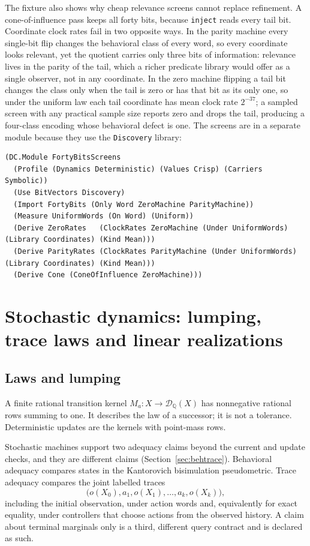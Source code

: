 \documentclass[11pt]{article}
\newcommand{\code}[1]{\texttt{#1}}
\newcommand{\Q}{\mathbb{Q}}
\theoremstyle{definition}
\theoremstyle{plain}
\begin{document}
The fixture also shows why cheap relevance screens cannot replace refinement. A cone-of-influence
pass keeps all forty bits, because \code{inject} reads every tail bit. Coordinate clock rates
\cite{paperone} fail in two opposite ways. In the parity machine every single-bit flip changes
the behavioral class of every word, so every coordinate looks relevant, yet the quotient carries
only three bits of information: relevance lives in the parity of the tail, which a richer
predicate library would offer as a single observer, not in any coordinate. In the zero machine
flipping a tail bit changes the class only when the tail is zero or has that bit as its only one,
so under the uniform law each tail coordinate has mean clock rate $2^{-37}$; a sampled screen with
any practical sample size reports zero and drops the tail, producing a four-class encoding whose
behavioral defect is one. The screens are in a separate module because they use the
\code{Discovery} library:
\begin{lstlisting}[basicstyle=\ttfamily\footnotesize,title={\scriptsize\ttfamily fixtures/forty\_bits.metta}]
(DC.Module FortyBitsScreens
  (Profile (Dynamics Deterministic) (Values Crisp) (Carriers Symbolic))
  (Use BitVectors Discovery)
  (Import FortyBits (Only Word ZeroMachine ParityMachine))
  (Measure UniformWords (On Word) (Uniform))
  (Derive ZeroRates   (ClockRates ZeroMachine (Under UniformWords) (Library Coordinates) (Kind Mean)))
  (Derive ParityRates (ClockRates ParityMachine (Under UniformWords) (Library Coordinates) (Kind Mean)))
  (Derive Cone (ConeOfInfluence ZeroMachine)))
\end{lstlisting}

\section{Stochastic dynamics: lumping, trace laws and linear realizations}\label{sec:stoch}

\subsection{Laws and lumping}

A finite rational transition kernel $M_a:X\to\mathcal D_\Q(X)$ has nonnegative rational rows
summing to one. It describes the law of a successor; it is not a tolerance. Deterministic updates
are the kernels with point-mass rows.

Stochastic machines support two adequacy claims beyond the current and update checks, and they
are different claims (Section~\ref{sec:behtrace}). Behavioral adequacy compares states in the
Kantorovich bisimulation pseudometric. Trace adequacy compares the joint labelled traces
\[
\bigl(o(X_0),a_1,o(X_1),\dots,a_k,o(X_k)\bigr),
\]
including the initial observation, under action words and, equivalently for exact equality,
under controllers that choose actions from the observed history. A claim about terminal
marginals only is a third, different query contract and is declared as such.
\end{document}
